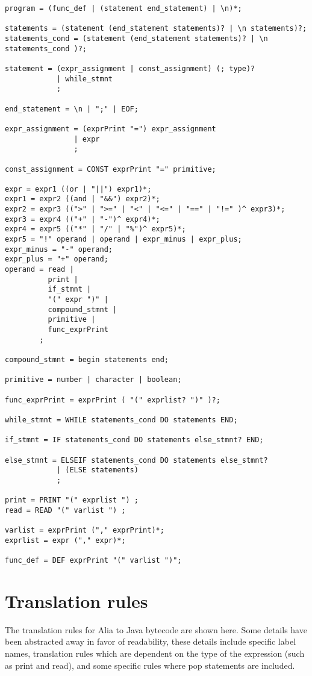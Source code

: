 \documentclass[paper=a4, fontsize=11pt]{article}
\numberwithin{equation}{section}		%
\numberwithin{figure}{section}			%
\numberwithin{table}{section}				%
\begin{document}
\begin{verbatim}
program = (func_def | (statement end_statement) | \n)*;

statements = (statement (end_statement statements)? | \n statements)?;
statements_cond = (statement (end_statement statements)? | \n statements_cond )?;

statement = (expr_assignment | const_assignment) (; type)?
			| while_stmnt 
			;

end_statement = \n | ";" | EOF;

expr_assignment = (exprPrint "=") expr_assignment
				| expr 
				;

const_assignment = CONST exprPrint "=" primitive;

expr = expr1 ((or | "||") expr1)*;
expr1 = expr2 ((and | "&&") expr2)*;
expr2 = expr3 ((">" | ">=" | "<" | "<=" | "==" | "!=" )^ expr3)*;
expr3 = expr4 (("+" | "-")^ expr4)*;
expr4 = expr5 (("*" | "/" | "%")^ expr5)*;
expr5 = "!" operand | operand | expr_minus | expr_plus;
expr_minus = "-" operand;
expr_plus = "+" operand;
operand = read |
	   	  print |
	   	  if_stmnt |
	   	  "(" expr ")" |
	   	  compound_stmnt |
	   	  primitive |
	   	  func_exprPrint
		;
		  
compound_stmnt = begin statements end;

primitive = number | character | boolean;

func_exprPrint = exprPrint ( "(" exprlist? ")" )?;

while_stmnt = WHILE statements_cond DO statements END;

if_stmnt = IF statements_cond DO statements else_stmnt? END;

else_stmnt = ELSEIF statements_cond DO statements else_stmnt?
			| (ELSE statements)
			;

print = PRINT "(" exprlist ") ;
read = READ "(" varlist ") ;

varlist = exprPrint ("," exprPrint)*;
exprlist = expr ("," expr)*;

func_def = DEF exprPrint "(" varlist ")";
\end{verbatim}

\section{Translation rules} %
The translation rules for Alia to Java bytecode are shown here. Some details have been abstracted away in favor of readability, these details include specific label names, translation rules which are dependent on the type of the expression (such as print and read), and some specific rules where pop statements are included.
\end{document}
